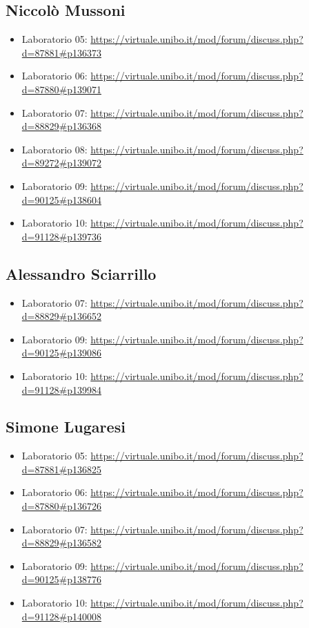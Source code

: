 \documentclass[a4paper,12pt]{report}
\begin{document}
\subsection*{Niccolò Mussoni}
\begin{itemize}
	\item Laboratorio 05: \url{https://virtuale.unibo.it/mod/forum/discuss.php?d=87881#p136373}
	\item Laboratorio 06: \url{https://virtuale.unibo.it/mod/forum/discuss.php?d=87880#p139071}
	\item Laboratorio 07: \url{https://virtuale.unibo.it/mod/forum/discuss.php?d=88829#p136368}
	\item Laboratorio 08: \url{https://virtuale.unibo.it/mod/forum/discuss.php?d=89272#p139072}
	\item Laboratorio 09: \url{https://virtuale.unibo.it/mod/forum/discuss.php?d=90125#p138604}
	\item Laboratorio 10: \url{https://virtuale.unibo.it/mod/forum/discuss.php?d=91128#p139736}
\end{itemize}

\subsection*{Alessandro Sciarrillo}
\begin{itemize}
	\item Laboratorio 07: \url{https://virtuale.unibo.it/mod/forum/discuss.php?d=88829#p136652}
	\item Laboratorio 09: \url{https://virtuale.unibo.it/mod/forum/discuss.php?d=90125#p139086}
	\item Laboratorio 10: \url{https://virtuale.unibo.it/mod/forum/discuss.php?d=91128#p139984}
\end{itemize}

\subsection*{Simone Lugaresi}
\begin{itemize}
	\item Laboratorio 05: \url{https://virtuale.unibo.it/mod/forum/discuss.php?d=87881#p136825}
	\item Laboratorio 06: \url{https://virtuale.unibo.it/mod/forum/discuss.php?d=87880#p136726}
	\item Laboratorio 07: \url{https://virtuale.unibo.it/mod/forum/discuss.php?d=88829#p136582}
	\item Laboratorio 09: \url{https://virtuale.unibo.it/mod/forum/discuss.php?d=90125#p138776}
	\item Laboratorio 10: \url{https://virtuale.unibo.it/mod/forum/discuss.php?d=91128#p140008}
\end{itemize}
\end{document}

